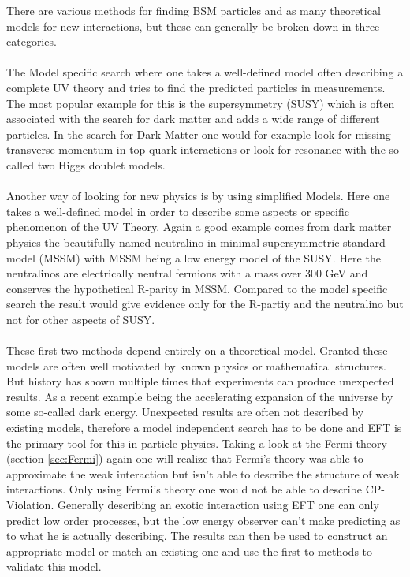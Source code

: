 \documentclass[../Bachelorarbeit.tex]{subfiles}
\begin{document}
There are various methods for finding BSM particles and as many theoretical models for new interactions, but these can generally be broken down in three categories.
\\\\
The Model specific search where one takes a well-defined model often describing a complete UV theory and tries to find the predicted particles in measurements.
The most popular example for this is the supersymmetry (SUSY) which is often associated with the search for dark matter and adds a wide range of different particles.
In the search for Dark Matter one would for example look for missing transverse momentum in top quark interactions or look for resonance with the so-called
two Higgs doublet models.
\\\\
Another way of looking for new physics is by using simplified Models. Here one takes a well-defined model in order to describe some aspects or specific phenomenon of the UV Theory.
Again a good example comes from dark matter physics the beautifully named neutralino in minimal supersymmetric standard model (MSSM) with MSSM being a low energy model of the SUSY.
Here the neutralinos are electrically neutral fermions with a mass over 300 GeV and conserves the hypothetical R-parity in MSSM. Compared to the model specific search the result
would give evidence only for the R-partiy and the neutralino but not for other aspects of SUSY.
\\\\
These first two methods depend entirely on a theoretical model. Granted these models are often well motivated by known physics or mathematical structures.
But history has shown multiple times that experiments can produce unexpected results. As a recent example being the accelerating expansion of the universe by some so-called dark energy.
Unexpected results are often not described by existing models, therefore a model independent search has to be done and EFT is the primary tool for this in particle physics.
Taking a look at the Fermi theory (section \ref{sec:Fermi}) again one will realize that Fermi's theory was able to approximate the weak interaction but isn't able to describe the
structure of weak interactions. Only using Fermi's theory one would not be able to describe CP-Violation. Generally describing an exotic interaction using EFT one can only predict low order
processes, but the low energy observer can't make predicting as to what he is actually describing. The results can then be used to construct an appropriate model or match an existing one and
use the first to methods to validate this model.
\end{document}
